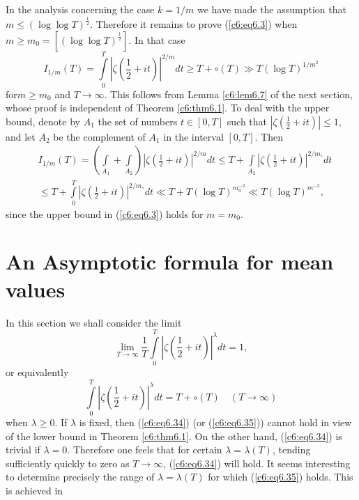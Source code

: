 In the analysis concerning the case $k = 1/m$ we have made the
assumption that $m\leq (\log \log T)^{\frac{1}{2}}$. Therefore it
remains to prove (\ref{c6:eq6.3}) when $m \geq m_0 = [(\log \log
  T)^{\frac{1}{2}}]$. In that case 
$$ 
I_{1/m} (T) = \int\limits^T_0 \left|\zeta \left(\frac{1}{2} + it
\right)\right|^{2/m} dt \geq T + \circ (T) \gg T(\log T)^{1/m^2} 
$$
for\pageoriginale $m \geq m_0$ and $T \to \infty$. This follows from
Lemma \ref{c6:lem6.7} of the next section, whose proof is independent
of Theorem \ref{c6:thm6.1}. To deal with the upper bound, denote by
$A_1$ the set of numbers $t \in [0,T]$ such that $|\zeta(\frac{1}{2} +
it)| \leq 1$, and let $A_2$ be the complement of $A_1$ in the interval
$[0,T]$. Then 
\begin{align*}
& I_{1/m} (T) = \left(\int\limits_{A_1} + \int\limits_{A_2} \right)
  \left|\zeta \left(\frac{1}{2} + it \right)\right|^{2/m} dt \leq T +
  \int\limits_{A_2} \left|\zeta \left(\frac{1}{2} + it
  \right)\right|^{2/m_\circ} dt\\ 
& \leq T + \int\limits^T_0 \left|\zeta \left(\frac{1}{2} + it
  \right)\right|^{2/m_\circ} dt \ll T + T(\log T)^{m^{-2}_0} \ll T
  (\log T)^{m^{-2}}, 
\end{align*}
since the upper bound in (\ref{c6:eq6.3}) holds for $m =m_0$.

\section{An Asymptotic formula for mean values}\label{c6:sec6.2}

In this section we shall consider the limit
\begin{equation}
\lim\limits_{T \to \infty} \frac{1}{T} \int\limits^T_0 \left|\zeta
\left(\frac{1}{2} + it \right)\right|^\lambda dt =1,
\label{c6:eq6.34} 
\end{equation}
or equivalently
\begin{equation}
\int\limits^T_0 \left|\zeta \left(\frac{1}{2} + it
\right)\right|^\lambda dt = T + \circ (T) \quad (T \to \infty)
\label{c6:eq6.35} 
\end{equation}
when $\lambda \geq 0$. If $\lambda$ is fixed, then (\ref{c6:eq6.34})
(or (\ref{c6:eq6.35})) cannot hold in view of the lower bound in
Theorem \ref{c6:thm6.1}. On the other hand, (\ref{c6:eq6.34}) is
trivial if $\lambda=0$. Therefore one feels that for certain $\lambda
= \lambda(T)$, tending sufficiently quickly to zero as $T \to \infty$,
(\ref{c6:eq6.34}) will hold. It seems interesting to determine
precisely the range of $\lambda = \lambda(T)$ for which
(\ref{c6:eq6.35}) holds. This is achieved in 

